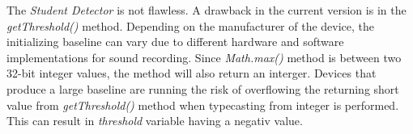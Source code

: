 The \emph{Student Detector} is not flawless. A drawback in the current version
is in the \emph{getThreshold()} method. Depending on the manufacturer of the
device, the
initializing baseline can vary due to different hardware and software
implementations for sound recording. Since \emph{Math.max()} method is between
two 32-bit integer values, the method will also return an interger. Devices that produce 
a large baseline are running the risk of overflowing the returning short value
from \emph{getThreshold()} method when typecasting from integer is performed.  
This can result in \emph{threshold} variable having a negativ value.






